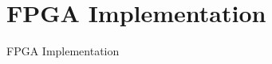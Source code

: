 \setlength{\parskip}{\baselineskip}
\section{FPGA Implementation}

\begin{frame}
    \huge FPGA Implementation
\end{frame}
